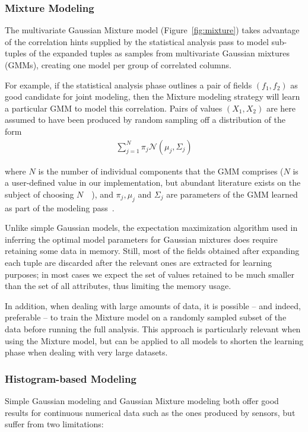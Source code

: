 \subsubsection{Mixture Modeling}
\label{sec:mixture_model}
The multivariate Gaussian Mixture model (Figure~\ref{fig:mixture}) takes advantage of the correlation hints supplied by the statistical analysis pass to model sub-tuples of the expanded tuples as samples from multivariate Gaussian mixtures (GMMs), creating one model per group of correlated columns.

For example, if the statistical analysis phase outlines a pair of fields $(f_1, f_2)$ as good candidate for joint modeling, then the Mixture modeling strategy will learn a particular GMM to model this correlation. Pairs of values $(X_1, X_2)$ are here assumed to have been produced by random sampling off a distribution of the form
\begin{align*}
\sum_{j=1}^{N} \pi_j \mathcal N(\mu_j, \Sigma_j)
\end{align*}

where $N$ is the number of individual components that the GMM comprises ($N$ is a user-defined value in our implementation, but abundant literature exists on the subject of choosing $N$~\cite{Schwartz1978}~\cite{Akaike1974}), and $\pi_j, \mu_j$ and $\Sigma_j$ are parameters of the GMM learned as part of the modeling pass~\cite{Dempster1977}.

Unlike simple Gaussian models, the expectation maximization algorithm used in inferring the optimal model parameters for Gaussian mixtures does require retaining some data in memory. Still, most of the fields obtained after expanding each tuple are discarded after the relevant ones are extracted for learning purposes; in most cases we expect the set of values retained to be much smaller than the set of all attributes, thus limiting the memory usage. 

In addition, when dealing with large amounts of data, it is possible -- and indeed, preferable -- to train the Mixture model on a randomly sampled subset of the data before running the full analysis. This approach is particularly relevant when using the Mixture model, but can be applied to all models to shorten the learning phase when dealing with very large datasets.

\subsubsection{Histogram-based Modeling}
\label{sec:histograms}
Simple Gaussian modeling and Gaussian Mixture modeling both offer good results for continuous numerical data such as the ones produced by sensors, but suffer from two limitations:

